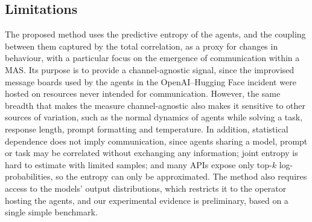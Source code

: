 \subsection*{Limitations}

The proposed method uses the predictive entropy of the agents, and the coupling between them captured by the total correlation, as a proxy for changes in behaviour, with a particular focus on the emergence of communication within a MAS. Its purpose is to provide a channel-agnostic signal, since the improvised message boards used by the agents in the OpenAI--Hugging Face incident were hosted on resources never intended for communication. However, the same breadth that makes the measure channel-agnostic also makes it sensitive to other sources of variation, such as the normal dynamics of agents while solving a task, response length, prompt formatting and temperature. In addition, statistical dependence does not imply communication, since agents sharing a model, prompt or task may be correlated without exchanging any information; joint entropy is hard to estimate with limited samples; and many APIs expose only top-$k$ log-probabilities, so the entropy can only be approximated. The method also requires access to the models' output distributions, which restricts it to the operator hosting the agents, and our experimental evidence is preliminary, based on a single simple benchmark.

